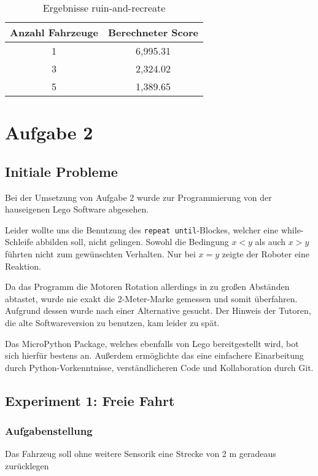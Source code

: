 \documentclass[ngerman]{tudscrreprt}
\newcommand{\code}[1]{\texttt{#1}}
\begin{document}
\begin{table}[]
    \centering
    \begin{tabular}{|c|c|}
    \hline
    Anzahl Fahrzeuge & Berechneter Score \\ \hline
    1                & 6,995.31          \\ \hline
    3                & 2,324.02          \\ \hline
    5                & 1,389.65          \\ \hline
    \end{tabular}
    \caption{Ergebnisse ruin-and-recreate}
    \label{ruin-and-recreate}
\end{table}

\chapter{Aufgabe 2}
\section{Initiale Probleme}
Bei der Umsetzung von Aufgabe 2 wurde zur Programmierung von der hauseigenen Lego Software abgesehen.

Leider wollte uns die Benutzung des \code{repeat until}-Blockes, welcher eine while-Schleife abbilden soll, nicht gelingen.
Sowohl die Bedingung $x < y$ als auch $x > y$ führten nicht zum gewünschten Verhalten.
Nur bei $x = y$ zeigte der Roboter eine Reaktion.

Da das Programm die Motoren Rotation allerdings in zu großen Abständen abtastet, wurde nie exakt die 2-Meter-Marke gemessen und somit überfahren.
Aufgrund dessen wurde nach einer Alternative gesucht. Der Hinweis der Tutoren, die alte Softwareversion zu benutzen, kam leider zu spät.

Das MicroPython Package, welches ebenfalls von Lego bereitgestellt wird, bot sich hierfür bestens an.
Außerdem ermöglichte das eine einfachere Einarbeitung durch Python-Vorkenntnisse, verständlicheren Code und Kollaboration durch Git.


\section{Experiment 1: Freie Fahrt}
\subsection{Aufgabenstellung}
Das Fahrzeug soll ohne weitere Sensorik eine Strecke von 2 m geradeaus
zurücklegen
\end{document}
